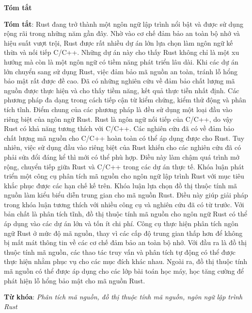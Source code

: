 \begin{center}
\textbf{\large{Tóm tắt}}
\end{center}


\begin{small}
\textbf{Tóm tắt}: Rust đang trở thành một ngôn ngữ lập trình nổi bật và được sử dụng rộng rãi trong những năm gần đây.
Nhờ vào cơ chế đảm bảo an toàn bộ nhớ và hiệu suất vượt trội, Rust được rất nhiều dự án lớn lựa chọn làm ngôn ngữ kế thừa và nối tiếp C/C++.
Những dự án này cho thấy Rust không chỉ là một xu hướng mà còn là một ngôn ngữ có tiềm năng phát triển lâu dài.
Khi các dự án lớn chuyển sang sử dụng Rust, việc đảm bảo mã nguồn an toàn, tránh lỗ hổng bảo mật rất được đề cao.
Đã có những nghiên cứu về đảm bảo chất lượng mã nguồn được thực hiện và cho thấy tiềm năng, kết quả thực tiễn nhất định.
Các phương pháp đa dạng trong cách tiếp cận từ kiểm chứng, kiểm thử động và phân tích tĩnh.
Điểm chung của các phương pháp là đều sử dụng một loại đầu vào riêng biệt của ngôn ngữ Rust.
Rust là ngôn ngữ nối tiếp của C/C++, do vậy Rust có khả năng tương thích với C/C++.
Các nghiên cứu đã có về đảm bảo chất lượng mã nguồn cho C/C++ hoàn toàn có thể áp dụng được cho Rust.
Tuy nhiên, việc sử dụng đầu vào riêng biệt của Rust khiến cho các nghiên cứu đã có phải sửa đổi đáng kể thì mới có thể phù hợp.
Điều này làm chậm quá trình mở rộng, chuyển tiếp giữa Rust và C/C++ trong các dự án thực tế.
Khóa luận phát triển một công cụ phân tích mã nguồn cho ngôn ngữ lập trình Rust với mục tiêu khắc phục được các hạn chế kế trên.
Khóa luận lựa chọn đồ thị thuộc tính mã nguồn làm kiểu biểu diễn trung gian cho mã nguồn Rust.
Điều này giúp giải pháp trong khóa luận tương thích với nhiều công cụ và nghiên cứu đã có từ trước.
Với bản chất là phân tích tĩnh, đồ thị thuộc tính mã nguồn cho ngôn ngữ Rust có thể áp dụng vào các dự án lớn và tốn ít chi phí.
Công cụ thực hiện phân tích ngôn ngữ Rust ở mức độ mã nguồn, thay vì các cấp độ trung gian thấp hơn để không bị mất mát thông tin về các cơ chế đảm bảo an toàn bộ nhớ.
Với đầu ra là đồ thị thuộc tính mã nguồn, các thao tác truy vấn và phân tích tự động có thể được thực hiện nhằm phục vụ cho các mục đích khác nhau.
Ngoài ra, đồ thị thuộc tính mã nguồn có thể được áp dụng cho các lớp bài toán học máy, học tăng cường để phát hiện lỗ hổng bảo mật cho mã nguồn Rust.

\vspace*{1cm}
\textbf{Từ khóa}: \textit{Phân tích mã nguồn, đồ thị thuộc tính mã nguồn, ngôn ngữ lập trình Rust}

\end{small}
